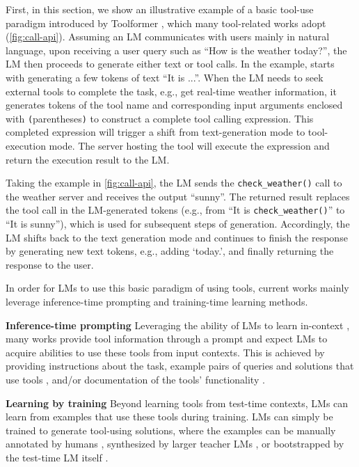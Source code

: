First, in this section, we show an illustrative example of a basic tool-use paradigm introduced by Toolformer \citep{schick2023toolformer}, which many tool-related works adopt (\autoref{fig:call-api}). Assuming an LM communicates with users mainly in natural language, upon receiving a user query such as ``How is the weather today?'', the LM then proceeds to generate either text or tool calls. In the example, starts with generating a few tokens of text ``It is ...''. When the LM needs to seek external tools to complete the task, e.g., get real-time weather information, it generates tokens of the tool name and corresponding input arguments enclosed with \texttt{(}parentheses\texttt{)} to construct a complete tool calling expression. 
This completed expression will trigger a shift from text-generation mode to tool-execution mode. The server hosting the tool will execute the expression and return the execution result to the LM. 

Taking the example in \autoref{fig:call-api}, the LM sends the \texttt{check\_weather()} call to the weather server and receives the output ``sunny''. The returned result replaces the tool call in the LM-generated tokens (e.g., from ``It is \texttt{check\_weather()}'' to ``It is sunny''), which is used for subsequent steps of generation.
Accordingly, the LM shifts back to the text generation mode and continues to finish the response by generating new text tokens, e.g., adding `today.', and finally returning the response to the user.

In order for LMs to use this basic paradigm of using tools, current works mainly leverage inference-time prompting and training-time learning methods.

\noindent \textbf{Inference-time prompting} \quad
Leveraging the ability of LMs to learn in-context \citep{}, many works provide tool information through a prompt and expect LMs to acquire abilities to use these tools from input contexts.
This is achieved by providing instructions about the task, example pairs of queries and solutions that use tools \citep{gupta2022visual,lu2023chameleon,paranjape2023art,shen2023hugginggpt,yang2023mmreact}, and/or documentation of the tools' functionality \citep{hsieh2023tool}.


\noindent \textbf{Learning by training} \quad
Beyond learning tools from test-time contexts, LMs can learn from examples that use these tools during training.
LMs can simply be trained to generate tool-using solutions, where the examples can be manually annotated by humans \citep{li-etal-2023-api}, synthesized by larger teacher LMs \citep{tang2023toolalpaca,qin2023toolllm,huang2024metatool}, or bootstrapped by the test-time LM itself \citep{schick2023toolformer}.
